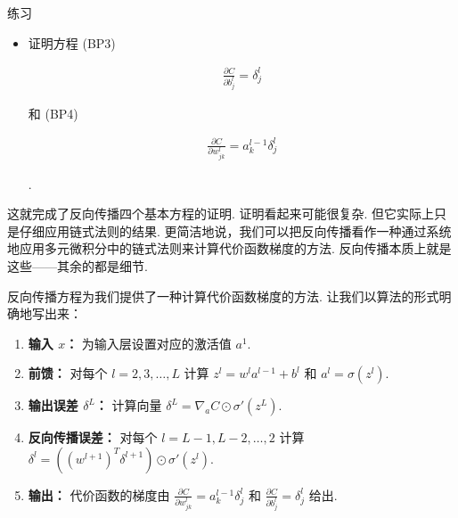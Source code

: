 \begin{exerciseBox}{练习}

\begin{itemize}

\item
证明方程 (BP3)

\begin{align*}
\frac{\partial C}{\partial b^l_j} = \delta^l_j \nonumber
\end{align*}

和 (BP4)

\begin{align*}
\frac{\partial C}{\partial w^l_{jk}} = a^{l-1}_k \delta^l_j \nonumber
\end{align*}

.

\end{itemize}

这就完成了反向传播四个基本方程的证明. 证明看起来可能很复杂. 但它实际上只是仔细应用链式法则的结果. 更简洁地说，我们可以把反向传播看作一种通过系统地应用多元微积分中的链式法则来计算代价函数梯度的方法. 反向传播本质上就是这些——其余的都是细节.

\end{exerciseBox}

反向传播方程为我们提供了一种计算代价函数梯度的方法. 让我们以算法的形式明确地写出来：

\begin{enumerate}

\item \textbf{输入 $x$：} 为输入层设置对应的激活值 $a^{1}$.

\item \textbf{前馈：} 对每个 $l = 2, 3, \ldots, L$ 计算 $z^{l} = w^l a^{l-1}+b^l$ 和 $a^{l} = \sigma(z^{l})$.

\item \textbf{输出误差 $\delta^L$：} 计算向量 $\delta^{L} = \nabla_a C \odot \sigma'(z^L)$.

\item \textbf{反向传播误差：} 对每个 $l = L-1, L-2, \ldots, 2$ 计算 $\delta^{l} = ((w^{l+1})^T \delta^{l+1}) \odot \sigma'(z^{l})$.

\item \textbf{输出：} 代价函数的梯度由 $\frac{\partial C}{\partial w^l_{jk}} = a^{l-1}_k \delta^l_j$ 和 $\frac{\partial C}{\partial b^l_j} = \delta^l_j$ 给出.

\end{enumerate}

